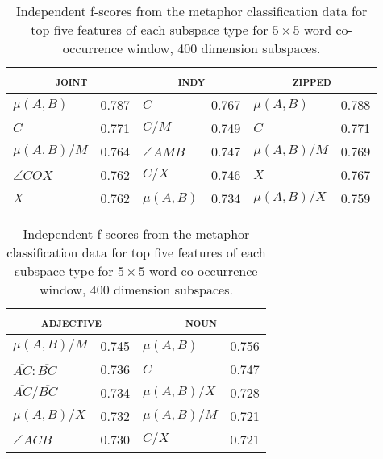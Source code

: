 \begin{table}
\centering
\begin{tabular}{lr|lr|lr}
\hline
\multicolumn{2}{c}{\textsc{joint}} & \multicolumn{2}{c}{\textsc{indy}} & \multicolumn{2}{c}{\textsc{zipped}} \\
\hline
$\mu(A,B)$ & 0.787 & $C$ & 0.767 & $\mu(A,B)$ & 0.788 \\
$C$ & 0.771 & $C/M$ & 0.749 & $C$ & 0.771 \\
$\mu(A,B)/M$ & 0.764 & $\angle AMB$ & 0.747 & $\mu(A,B)/M$ & 0.769 \\
$\angle COX$ & 0.762 & $C/X$ & 0.746 & $X$ & 0.767 \\
$X$ & 0.762 & $\mu(A,B)$ & 0.734 & $\mu(A,B)/X$ & 0.759 \\
\hline
\end{tabular}
\vfill
\begin{tabular}{lr|lr}
\multicolumn{2}{c}{\textsc{adjective}} & \multicolumn{2}{c}{\textsc{noun}} \\
\hline
$\mu(A,B)/M$ & 0.745 & $\mu(A,B)$ & 0.756 \\
$\overline{AC}:\overline{BC}$ & 0.736 & $C$ & 0.747 \\
$\overline{AC}/\overline{BC}$ & 0.734 & $\mu(A,B)/X$ & 0.728 \\
$\mu(A,B)/X$ & 0.732 & $\mu(A,B)/M$ & 0.721 \\
$\angle ACB$ & 0.730 & $C/X$ & 0.721 \\
\hline
\end{tabular}
\caption[Top Independent Features for Metaphor Classification]{Independent f-scores from the metaphor classification data for top five features of each subspace type for $5 \times 5$ word co-occurrence window, 400 dimension subspaces.}
\label{tab:ind-metaphor}
\end{table}

